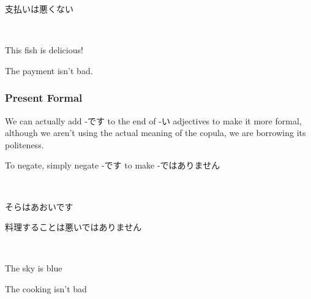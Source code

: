 \documentclass{article}
\begin{document}
\begin{CJK}{UTF8}{min}
\begin{example}
支払いは悪くない
\end{example}

\begin{solution}
\ 

This fish is delicious!

The payment isn't bad.
\end{solution}

\subsubsection{Present Formal}

We can actually add -です to the end of -い adjectives to make it more formal, although we aren't using the actual meaning of the copula, we are borrowing its politeness.

To negate, simply negate -です to make -ではありません
\begin{example}
\ 

そらはあおいです

料理することは悪いではありません
\end{example}

\begin{solution}
\ 

The sky is blue

The cooking isn't bad
\end{solution}
\end{CJK}
\end{document}

